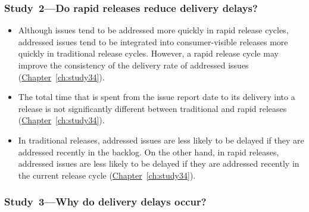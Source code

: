 \subsubsection*{Study~2---Do rapid releases reduce delivery delays?}

\begin{itemize}

	\item Although issues tend to be addressed more quickly in rapid
		release cycles, addressed issues tend to be integrated into
		consumer-visible releases more quickly in traditional
		release cycles. However, a rapid release cycle may improve the
		consistency of the delivery rate of addressed issues
		(\hyperref[ch:study34]{Chapter}~\ref{ch:study34}).

	\item The total time that is spent from the issue report date to its
		delivery into a release is not significantly different
		between traditional and rapid releases
		(\hyperref[ch:study34]{Chapter}~\ref{ch:study34}).

	\item In traditional releases, addressed issues are less likely to be
		delayed if they are addressed recently in the backlog. On the
		other hand, in rapid releases, addressed issues are less likely
		to be delayed if they are addressed recently in the current
		release cycle (\hyperref[ch:study34]{Chapter}~\ref{ch:study34}). 
\end{itemize}

\subsubsection*{Study~3---Why do delivery delays occur?}

